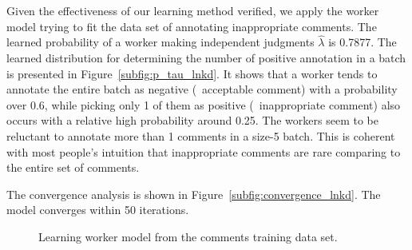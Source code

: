Given the effectiveness of our learning method verified, 
we apply the worker model trying to fit the data set of annotating inappropriate comments.  
The learned probability of a worker making independent judgments $\hat{\lambda}$ is 0.7877.  
The learned distribution for determining the number of positive annotation in a batch is presented in Figure~\ref{subfig:p_tau_lnkd}.  
It shows that a worker tends to annotate the entire batch as negative (\ie~acceptable comment) with a probability over 0.6, 
while picking only 1 of them as positive (\ie~inappropriate comment) also occurs with a relative high probability around 0.25.  
The workers seem to be reluctant to annotate more than 1 comments in a size-5 batch.  
This is coherent with most people's intuition that inappropriate comments are rare comparing to the entire set of comments.  

The convergence analysis is shown in Figure~\ref{subfig:convergence_lnkd}.  
The model converges within 50 iterations.  


\begin{figure}[!t]
  \centering
  \caption{\label{fig:lnkd_training}
  Learning worker model from the comments training data set.
  }
\end{figure}


